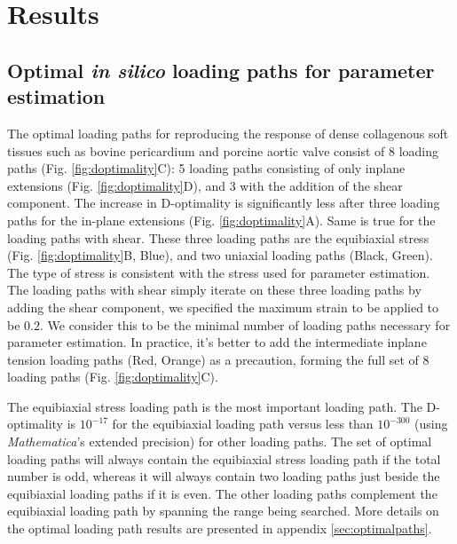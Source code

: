 \section{Results}


\subsection{Optimal \textit{in silico} loading paths for parameter estimation}

	The optimal loading paths for reproducing the response of dense collagenous soft tissues such as bovine pericardium and porcine aortic valve consist of 8 loading paths (Fig. \ref{fig:doptimality}C): 5 loading paths consisting of only inplane extensions (Fig. \ref{fig:doptimality}D), and 3 with the addition of the shear component. The increase in D-optimality is significantly less after three loading paths for the in-plane extensions (Fig. \ref{fig:doptimality}A). Same is true for the loading paths with shear. These three loading paths are the equibiaxial stress (Fig. \ref{fig:doptimality}B, Blue), and two uniaxial loading paths (Black, Green). The type of stress is consistent with the stress used for parameter estimation. The loading paths with shear simply iterate on these three loading paths by adding the shear component, we specified the maximum strain to be applied to be $0.2$. We consider this to be the minimal number of loading paths necessary for parameter estimation. In practice, it's better to add the intermediate inplane tension loading paths (Red, Orange) as a precaution, forming the full set of 8 loading paths (Fig. \ref{fig:doptimality}C). 
    
    
    The equibiaxial stress loading path is the most important loading path. The D-optimality is $10^{-17}$ for the equibiaxial loading path versus less than $10^{-300}$ (using \textit{Mathematica}'s extended precision) for other loading paths. The set of optimal loading paths will always contain the equibiaxial stress loading path if the total number is odd, whereas it will always contain two loading paths just beside the equibiaxial loading paths if it is even. The other loading paths complement the equibiaxial loading path by spanning the range being searched. More details on the optimal loading path results are presented in appendix \ref{sec:optimalpaths}.
    
